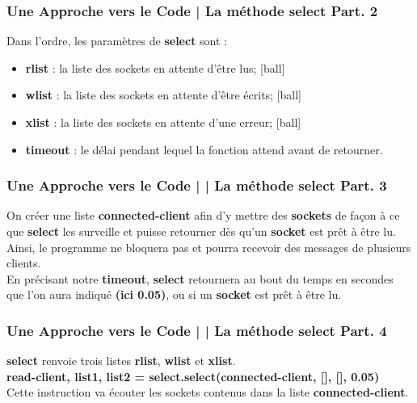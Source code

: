 \documentclass[handout]{beamer}
\begin{document}
	\begin{frame}
	\frametitle{Une Approche vers le Code | La méthode select Part. 2}
	Dans l'ordre, les paramètres de {\bfseries select} sont : \newline \\
	\begin{itemize}
		\item {\bfseries rlist} : la liste des sockets en attente d'être lus;
		\item {\bfseries wlist} : la liste des sockets en attente d'être écrits;
		\item {\bfseries xlist} : la liste des sockets en attente d'une erreur;
		\item {\bfseries timeout} : le délai pendant lequel la fonction attend avant de 		retourner.
	\end{itemize}
	\end{frame}

	\begin{frame}
	\frametitle{Une Approche vers le Code | | La méthode select Part. 3}
	On créer une liste {\bfseries connected-client} afin d'y mettre des 			{\bfseries sockets} de façon à ce que {\bfseries select} les surveille et 		puisse retourner dès qu'un {\bfseries socket} est prêt à être lu.
	Ainsi, le programme ne bloquera pas et pourra recevoir des messages de 			plusieurs clients.\newline \\
	
	En précisant notre {\bfseries timeout}, {\bfseries select} retournera au bout du temps en secondes que l'on aura indiqué {\bfseries (ici 0.05)}, ou si un {\bfseries socket} est prêt à être lu.
	\end{frame}

	\begin{frame}
	\frametitle{Une Approche vers le Code | | La méthode select Part. 4}
	{\bfseries select} renvoie trois listes {\bfseries rlist}, {\bfseries wlist} 		et {\bfseries xlist}.\newline \\

	{\bfseries read-client, list1, list2 = select.select(connected-client, [], 			[],	0.05)}\newline \\
	Cette instruction va écouter les sockets contenus dans 	la liste {\bfseries 		connected-client}.
	\end{frame}
	
\end{document}
